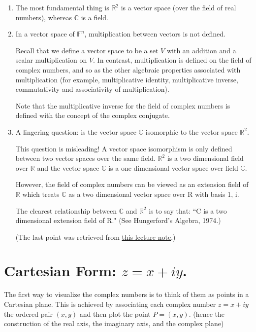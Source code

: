 \documentclass[11pt,reqno,oneside,a4paper]{article}
\begin{document}
\begin{enumerate}
	\item The most fundamental thing is $\mathbb{R}^2$ is a vector space (over the field of real numbers), whereas $\mathbb{C}$ is a field. 
	
	\item In a vector space of $\mathbb{F}^n$, multiplication between vectors is not defined. 
	
	Recall that we define a vector space to be a set $V$ with an addition and a scalar
	multiplication on $V$. In contrast, multiplication is defined on the field of complex numbers, and so as the other algebraic properties associated with multiplication (for example, multiplicative identity, multiplicative inverse, commutativity and associativity of multiplication). 
	
	Note that the multiplicative inverse for the field of complex numbers is defined with the concept of the complex conjugate.  
	
	\item A lingering question: is the vector space $\mathbb{C}$ isomorphic to the vector space $\mathbb{R}^2$.

	This question is misleading! A vector space isomorphism is only defined between two vector spaces over the same field. $\mathbb{R}^2$ is a two dimensional field over $\mathbb{R}$ and the vector space $\mathbb{C}$ is a one dimensional vector space over field $\mathbb{C}$.
	 
	However, the field of complex numbers can be viewed as an extension field of $\mathbb{R}$ which treats $\mathbb{C}$ as a two dimensional vector space over R with basis {1, i}. 
	
	The clearest relationship between $\mathbb{C}$ and $\mathbb{R}^2$ is to say that: ``C is a two dimensional extension field of R."	(See Hungerford’s Algebra, 1974.)
	
	(The last point was retrieved from \href{https://faculty.etsu.edu/gardnerr/5510/notes/I-2.pdf}{this lecture note}.)
\end{enumerate}

\section{Cartesian Form: $z=x +iy$.}

The first way to visualize the complex numbers is to think of them as points in a Cartesian plane. This is achieved by associating each complex number $z=x +iy$ the ordered pair $(x,y)$ and then plot the point $P=(x,y).$ (hence the construction of the real axis, the imaginary axis, and the complex plane)
\end{document}
